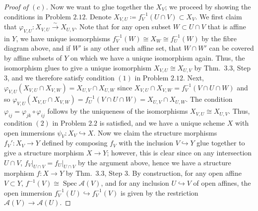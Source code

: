 \documentclass[12pt,letterpaper]{article}
\theoremstyle{definition}
\theoremstyle{remark}
\numberwithin{equation}{section}
\numberwithin{figure}{problem}
\DeclareMathOperator{\Spec}{Spec}
\newcommand{\Aa}{\mathscr{A}}
\newcommand{\isoto}{\overset{\sim}{\to}}
\begin{document}
\begin{proof}[Proof of $(c)$]
  \par Now we want to glue together the $X_V$; we proceed by showing the conditions in Problem $2.12$. Denote $X_{V,U} \coloneqq f_V^{-1}(U \cap V) \subset X_V$. We first claim that $\varphi_{V,U}\colon X_{V,U} \isoto X_{U,V}$. Note that for any open subset $W \subset U \cap V$ that is affine in $Y$, we have unique isomorphisms $f_V^{-1}(W) \cong X_W \cong f_U^{-1}(W)$ by the fibre diagram above, and if $W'$ is any other such affine set, that $W \cap W'$ can be covered by affine subsets of $Y$ on which we have a unique isomorphism again. Thus, the isomorphism glues to give a unique isomorphism $X_{V,U} \cong X_{U,V}$ by Thm.~3.3, Step 3, and we therefore satisfy condition $(1)$ in Problem $2.12$. Next, $\varphi_{V,U}(X_{V,U} \cap X_{V,W}) = X_{U,V} \cap X_{U,W}$ since $X_{V,U} \cap X_{V,W} = f_V^{-1}(V \cap U \cap W)$ and so $\varphi_{V,U}(X_{V,U} \cap X_{V,W}) = f_U^{-1}(V \cap U \cap W) = X_{U,V} \cap X_{U,W}$. The condition $\varphi_{ij} = \varphi_{jk} \circ \varphi_{ij}$ follows by the uniqueness of the isomorphisms $X_{V,U} \cong X_{U,V}$. Thus, condition $(2)$ in Problem $2.2$ is satisfied, and we have a unique scheme $X$ with open immersions $\psi_V\colon X_V \hookrightarrow X$. Now we claim the structure morphisms $f_V'\colon X_V \to Y$ defined by composing $f_V$ with the inclusion $V \hookrightarrow Y$ glue together to give a structure morphism $X \to Y$; however, this is clear since on any intersection $U \cap V$, $f_V\vert_{U \cap V} = f_U\vert_{U \cap V}$ by the argument above, hence we have a structure morphism $f\colon X \to Y$ by Thm.~3.3, Step 3. By construction, for any open affine $V \subset Y$, $f^{-1}(V) \cong \Spec \Aa(V)$, and for any inclusion $U \hookrightarrow V$ of open affines, the open immersion $f_V^{-1}(U) \hookrightarrow f_V^{-1}(V)$ is given by the restriction $\Aa(V) \to \Aa(U)$.
\end{proof}
\end{document}
